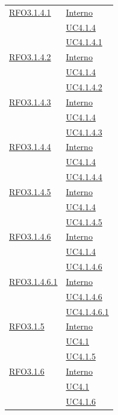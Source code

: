 \begin{longtable}{|>{\centering}m{5cm}|m{5cm}<{\centering}|}
\hyperlink{RFO3.1.4.1}{RFO3.1.4.1} & \hyperlink{Interno}{Interno}\\
& \hyperref[UC4.1.4]{UC4.1.4}\\
& \hyperref[UC4.1.4.1]{UC4.1.4.1}\\ \hline

\hyperlink{RFO3.1.4.2}{RFO3.1.4.2} & \hyperlink{Interno}{Interno}\\
& \hyperref[UC4.1.4]{UC4.1.4}\\
& \hyperref[UC4.1.4.2]{UC4.1.4.2}\\ \hline

\hyperlink{RFO3.1.4.3}{RFO3.1.4.3} & \hyperlink{Interno}{Interno}\\
& \hyperref[UC4.1.4]{UC4.1.4}\\
& \hyperref[UC4.1.4.3]{UC4.1.4.3}\\ \hline

\hyperlink{RFO3.1.4.4}{RFO3.1.4.4} & \hyperlink{Interno}{Interno}\\
& \hyperref[UC4.1.4]{UC4.1.4}\\
& \hyperref[UC4.1.4.4]{UC4.1.4.4}\\ \hline

\hyperlink{RFO3.1.4.5}{RFO3.1.4.5} & \hyperlink{Interno}{Interno}\\
& \hyperref[UC4.1.4]{UC4.1.4}\\
& \hyperref[UC4.1.4.5]{UC4.1.4.5}\\ \hline

\hyperlink{RFO3.1.4.6}{RFO3.1.4.6} & \hyperlink{Interno}{Interno}\\
& \hyperref[UC4.1.4]{UC4.1.4}\\
& \hyperref[UC4.1.4.6]{UC4.1.4.6}\\ \hline

\hyperlink{RFO3.1.4.6.1}{RFO3.1.4.6.1} & \hyperlink{Interno}{Interno}\\
& \hyperref[UC4.1.4.6]{UC4.1.4.6}\\
& \hyperref[UC4.1.4.6.1]{UC4.1.4.6.1}\\ \hline

\hyperlink{RFO3.1.5}{RFO3.1.5} & \hyperlink{Interno}{Interno}\\
& \hyperref[UC4.1]{UC4.1}\\
& \hyperref[UC4.1.5]{UC4.1.5}\\ \hline

\hyperlink{RFO3.1.6}{RFO3.1.6} & \hyperlink{Interno}{Interno}\\
& \hyperref[UC4.1]{UC4.1}\\
& \hyperref[UC4.1.6]{UC4.1.6}\\ \hline


\end{longtable}
